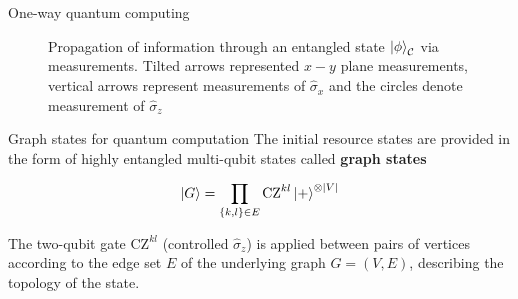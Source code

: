 \documentclass[final]{beamer}
\newlength{\colwidth}
\begin{document}
\begin{frame}[t]
\begin{columns}[t]
\begin{column}{\colwidth}
\begin{block}{One-way quantum computing}
\begin{figure}[H]
\begin{tikzpicture}
                        \end{tikzpicture}
                        \caption{Propagation of information through an entangled state
                            $\ket{\phi}_{\mathcal{C}}$ via measurements. Tilted
                            arrows represented $x-y$ plane measurements, vertical arrows represent
                            measurements of $\hat{\sigma}_x$ and the circles denote measurement of
                        $\hat{\sigma}_z$}
                        \label{fig:information_propagation_through_a_cluster_state}
                    \end{figure}
                \end{block}

                \begin{block}{Graph states for quantum computation}
                    The initial resource states are provided in the form of highly
                    entangled multi-qubit states called \textbf{graph states}

                    \begin{align}
                        \ket{G} = \displaystyle\prod_{\{k, l\} \in E}
                        \text{CZ}^{kl}\ket{+}^{\otimes |V|}
                        \label{eq:graph_state_preparation}
                    \end{align}

                    The two-qubit gate $\text{CZ}^{kl}$ (controlled
                    $\hat{\sigma}_z$) is applied between pairs of
                    vertices according to the edge set $E$ of the underlying graph
                    $G= (V, E)$, describing the topology of the state.


\end{block}
\end{column}
\end{columns}
\end{frame}
\end{document}
